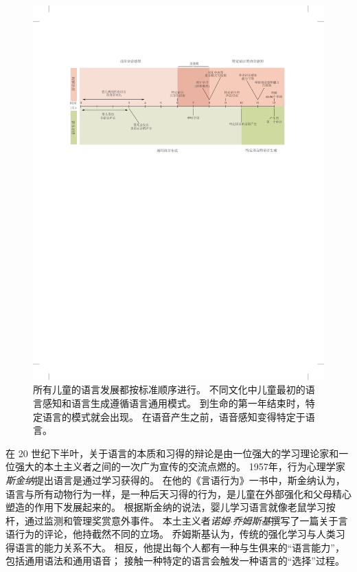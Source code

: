 \begin{figure}[htbp]
	\centering
	\includegraphics[width=1.0\linewidth]{chap55/fig_55_2}
	\caption{所有儿童的语言发展都按标准顺序进行。
		不同文化中儿童最初的语言感知和语言生成遵循语言通用模式。
		到生命的第一年结束时，特定语言的模式就会出现。
		在语音产生之前，语音感知变得特定于语言\cite{doupe1999birdsong}。
	}
	\label{fig:55_2}
\end{figure}


在 20 世纪下半叶，关于语言的本质和习得的辩论是由一位强大的学习理论家和一位强大的本土主义者之间的一次广为宣传的交流点燃的。
1957年，行为心理学家\textit{斯金纳}提出语言是通过学习获得的。
在他的《言语行为》一书中，斯金纳认为，语言与所有动物行为一样，是一种后天习得的行为，是儿童在外部强化和父母精心塑造的作用下发展起来的。
根据斯金纳的说法，婴儿学习语言就像老鼠学习按杆，通过监测和管理奖赏意外事件。
本土主义者\textit{诺姆$\cdot$乔姆斯基}撰写了一篇关于言语行为的评论，他持截然不同的立场。
乔姆斯基认为，传统的强化学习与人类习得语言的能力关系不大。
相反，他提出每个人都有一种与生俱来的“语言能力”，包括通用语法和通用语音；
接触一种特定的语言会触发一种语言的“选择”过程。


